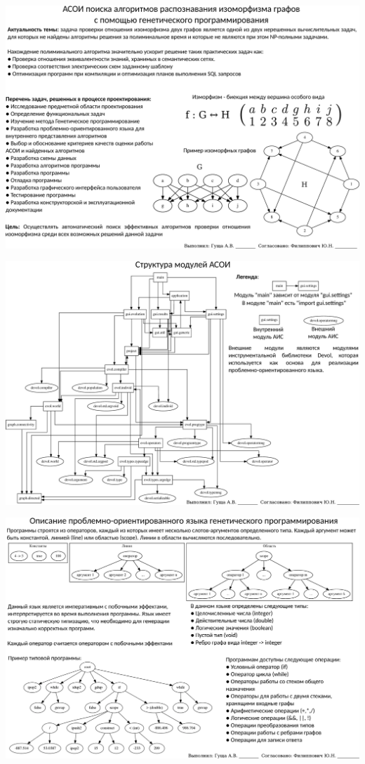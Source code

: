 \documentclass[russian,utf8, a1paper, emptystyle]{eskdgraph}
\begin{document}
\begin{ESKDdrawing}

\includegraphics[scale=1.0]{list1}

\end{ESKDdrawing}

\begin{ESKDdrawing}
\includegraphics[scale=0.98]{list2}
\end{ESKDdrawing}

\begin{ESKDdrawing}
\includegraphics[scale=0.98]{list3}
\end{ESKDdrawing}
\end{document}
